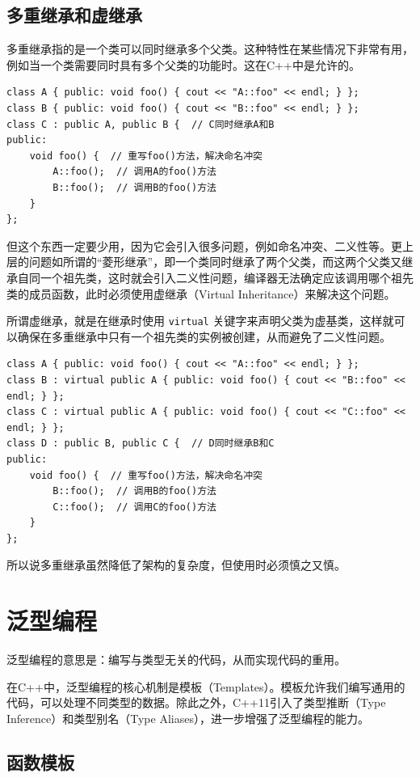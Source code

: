 \subsection{多重继承和虚继承}

多重继承指的是一个类可以同时继承多个父类。这种特性在某些情况下非常有用，例如当一个类需要同时具有多个父类的功能时。这在C++中是允许的。
\begin{verbatim}
class A { public: void foo() { cout << "A::foo" << endl; } };
class B { public: void foo() { cout << "B::foo" << endl; } };
class C : public A, public B {  // C同时继承A和B
public:
    void foo() {  // 重写foo()方法，解决命名冲突
        A::foo();  // 调用A的foo()方法
        B::foo();  // 调用B的foo()方法
    }
};
\end{verbatim}

但这个东西一定要少用，因为它会引入很多问题，例如命名冲突、二义性等。更上层的问题如所谓的“菱形继承”，即一个类同时继承了两个父类，而这两个父类又继承自同一个祖先类，这时就会引入二义性问题，编译器无法确定应该调用哪个祖先类的成员函数，此时必须使用虚继承（Virtual Inheritance）来解决这个问题。

所谓虚继承，就是在继承时使用 \texttt{virtual} 关键字来声明父类为虚基类，这样就可以确保在多重继承中只有一个祖先类的实例被创建，从而避免了二义性问题。
\begin{verbatim}
class A { public: void foo() { cout << "A::foo" << endl; } };
class B : virtual public A { public: void foo() { cout << "B::foo" << endl; } };
class C : virtual public A { public: void foo() { cout << "C::foo" << endl; } };
class D : public B, public C {  // D同时继承B和C
public:
    void foo() {  // 重写foo()方法，解决命名冲突
        B::foo();  // 调用B的foo()方法
        C::foo();  // 调用C的foo()方法
    }
};
\end{verbatim}
所以说多重继承虽然降低了架构的复杂度，但使用时必须慎之又慎。

\section{泛型编程}

泛型编程的意思是：编写与类型无关的代码，从而实现代码的重用。

在C++中，泛型编程的核心机制是模板（Templates）。模板允许我们编写通用的代码，可以处理不同类型的数据。除此之外，C++11引入了类型推断（Type Inference）和类型别名（Type Aliases），进一步增强了泛型编程的能力。

\subsection{函数模板}

